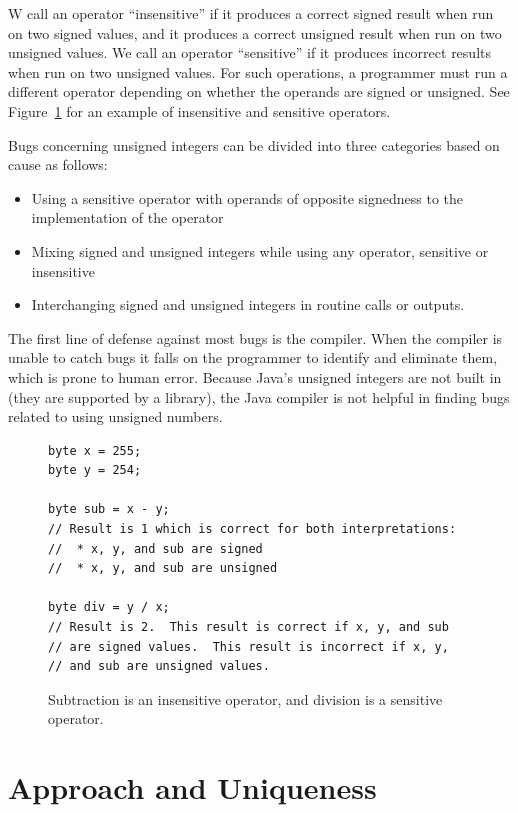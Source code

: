 \documentclass{sig-alternate-05-2015}
\begin{document}
W call an operator ``insensitive'' if it produces a correct signed result
when run on two signed values, and it produces a correct unsigned result
when run on two unsigned values.  We call an operator ``sensitive'' if it
produces incorrect results when run on two unsigned values.  For such
operations, a programmer must run a different operator depending on whether
the operands are signed or unsigned.  See Figure~\ref{fig:operators} for
an example of insensitive and sensitive operators.

Bugs concerning unsigned integers can be divided into three categories based on cause as follows:

\begin{itemize}
  \item Using a sensitive operator with operands of opposite signedness to the implementation of the operator
  \item Mixing signed and unsigned integers while using any operator, sensitive or insensitive
  \item Interchanging signed and unsigned integers in routine calls or outputs.
\end{itemize}

The first line of defense against most bugs is the compiler. When the
compiler is unable to catch bugs it falls on the programmer to identify and
eliminate them, which is prone to human error. Because Java's unsigned
integers are not built in (they are supported by a library), the Java
compiler is not helpful in finding bugs related to using unsigned
numbers.

\begin{figure}
\smaller
\begin{lstlisting}
byte x = 255;
byte y = 254;

byte sub = x - y;
// Result is 1 which is correct for both interpretations:
//  * x, y, and sub are signed
//  * x, y, and sub are unsigned

byte div = y / x;
// Result is 2.  This result is correct if x, y, and sub
// are signed values.  This result is incorrect if x, y,
// and sub are unsigned values.
\end{lstlisting}
\caption{Subtraction is an insensitive operator, and
  division is a sensitive operator.}
\label{fig:operators}
\end{figure}


\section{Approach and Uniqueness}
\end{document}
